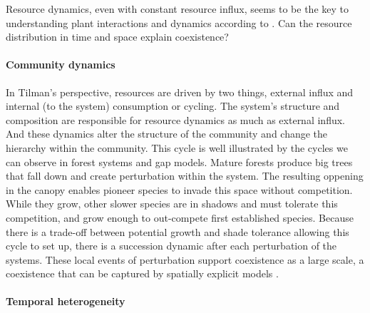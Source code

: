 
Resource dynamics, even with constant resource influx, seems to be the key to understanding plant interactions and dynamics according to \citet{tilman_plant_1988}. Can the resource distribution in time and space explain coexistence?

\paragraph{Community dynamics}

In Tilman's perspective, resources are driven by two things, external influx and internal (to the system) consumption or cycling. The system's structure and composition are responsible for resource dynamics as much as external influx. And these dynamics alter the structure of the community and change the hierarchy within the community. This cycle is well illustrated by the cycles we can observe in forest systems and gap models. Mature forests produce big trees that fall down and create perturbation within the system. The resulting oppening in the canopy enables pioneer species to invade this space without competition. While they grow, other slower species are in shadows and must tolerate this competition, and grow enough to out-compete first established species. Because there is a trade-off between potential growth and shade tolerance allowing this cycle to set up, there is a succession dynamic after each perturbation of the systems. These local events of perturbation support coexistence as a large scale, a coexistence that can be captured by spatially explicit models \parencite{chave_study_1999, falster_plant:_2016}.

\paragraph{Temporal heterogeneity}

